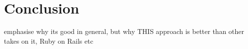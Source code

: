 \chapter{Conclusion}

emphasise why its good in general, but why THIS approach is better than other takes on it, Ruby on Rails etc